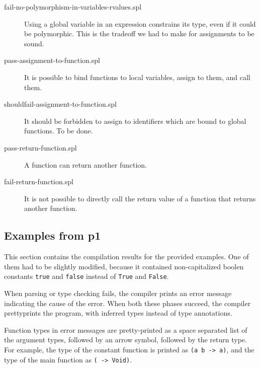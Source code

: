 \documentclass[a4paper]{article}
\begin{document}
\begin{description}
  \item[fail-no-polymorphism-in-variables-rvalues.spl] Using a global variable
  in an expression constrains its type, even if it could be polymorphic.  This
  is the tradeoff we had to make for assignments to be sound.

  \item[pass-assignment-to-function.spl] It is possible to bind functions to
  local variables, assign to them, and call them.

  \item[shouldfail-assignment-to-function.spl] It should be forbidden to assign
  to identifiers which are bound to global functions.  To be done.

  \item[pass-return-function.spl] A function can return another function.

  \item[fail-return-function.spl] It is not possible to directly call the return
  value of a function that returns another function.

\end{description}

\subsection{Examples from p1}

This section contains the compilation results for the provided examples.  One
of them had to be slightly modified, because it contained non-capitalized
boolen constants \texttt{true} and \texttt{false} instead of \texttt{True} and
\texttt{False}.

When parsing or type checking fails, the compiler prints an error message
indicating the cause of the error.  When both these phases succeed, the compiler
prettyprints the program, with inferred types instead of type annotations.

Function types in error messages are pretty-printed as a space separated list
of the argument types, followed by an arrow symbol, followed by the return
type.  For example, the type of the constant function is printed as \texttt{(a
b -> a)}, and the type of the main function as \texttt{( -> Void)}.
\end{document}
